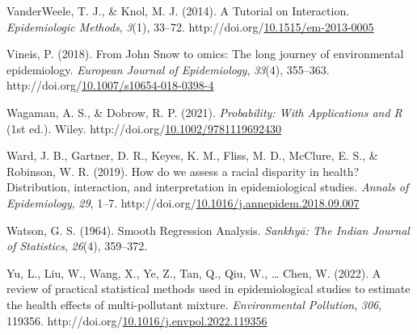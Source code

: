 \documentclass[12pt, twoside]{amherstthesis}
\newenvironment{CSLReferences}[2]%
  {}%
  {\par}
\begin{document}
\begin{CSLReferences}{1}{0}
\leavevmode{}%
VanderWeele, T. J., \& Knol, M. J. (2014). A {Tutorial} on {Interaction}. \emph{Epidemiologic Methods}, \emph{3}(1), 33--72. http://doi.org/\href{https://doi.org/10.1515/em-2013-0005}{10.1515/em-2013-0005}

\leavevmode{}%
Vineis, P. (2018). From {John} {Snow} to omics: The long journey of environmental epidemiology. \emph{European Journal of Epidemiology}, \emph{33}(4), 355--363. http://doi.org/\href{https://doi.org/10.1007/s10654-018-0398-4}{10.1007/s10654-018-0398-4}

\leavevmode{}%
Wagaman, A. S., \& Dobrow, R. P. (2021). \emph{Probability: {With} {Applications} and {R}} (1st ed.). Wiley. http://doi.org/\href{https://doi.org/10.1002/9781119692430}{10.1002/9781119692430}

\leavevmode{}%
Ward, J. B., Gartner, D. R., Keyes, K. M., Fliss, M. D., McClure, E. S., \& Robinson, W. R. (2019). How do we assess a racial disparity in health? {Distribution}, interaction, and interpretation in epidemiological studies. \emph{Annals of Epidemiology}, \emph{29}, 1--7. http://doi.org/\href{https://doi.org/10.1016/j.annepidem.2018.09.007}{10.1016/j.annepidem.2018.09.007}

\leavevmode{}%
Watson, G. S. (1964). Smooth {Regression} {Analysis}. \emph{Sankhyā: The Indian Journal of Statistics}, \emph{26}(4), 359--372.

\leavevmode{}%
Yu, L., Liu, W., Wang, X., Ye, Z., Tan, Q., Qiu, W., \ldots{} Chen, W. (2022). A review of practical statistical methods used in epidemiological studies to estimate the health effects of multi-pollutant mixture. \emph{Environmental Pollution}, \emph{306}, 119356. http://doi.org/\href{https://doi.org/10.1016/j.envpol.2022.119356}{10.1016/j.envpol.2022.119356}

\end{CSLReferences}
\end{document}
